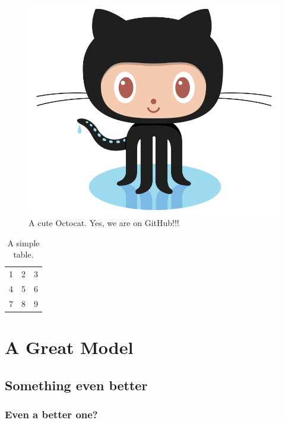 \documentclass[oneside,phd,]{snuthesis}
\begin{document}
\begin{figure}
\begin{center}
\includegraphics[width=\textwidth]{figs/Octocat}
\end{center}
\caption{A cute Octocat. Yes, we are on GitHub!!!}
\end{figure}

\begin{table}
\caption{A simple table.}
\begin{center}
\begin{tabular}{ l | c | r }
  1 & 2 & 3 \\
  4 & 5 & 6 \\
  7 & 8 & 9 \\
\end{tabular}
\end{center}
\end{table}

\chapter{A Great Model}\label{a-great-model}

\section{Something even better}\label{something-even-better}

\subsection{Even a better one?}\label{even-a-better-one}
\end{document}
